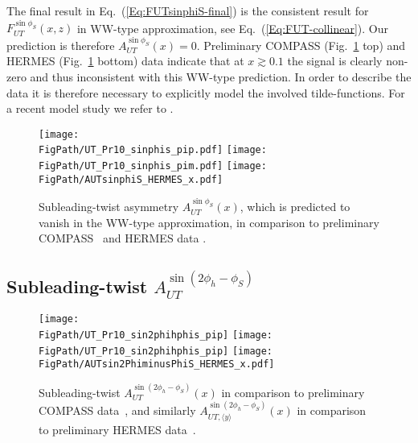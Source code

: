 \documentclass[a4paper,11pt]{article}
\newcommand{\blue}[1]{{\color{blue} #1}}
\newcommand{\ps}[1]{\blue{#1}}
\newcommand*{\FigPath}{./figs}%
\begin{document}
The final result in Eq.~(\ref{Eq:FUTsinphiS-final}) is the consistent
result for $F_{UT}^{\sin\phi_S}(x,z)$ in WW-type
approximation, see Eq.~(\ref{Eq:FUT-collinear}). Our prediction is
therefore $A_{UT}^{\sin\phi_S}(x)=0$. Preliminary
COMPASS \cite{Parsamyan:2013fia} (Fig.~\ref{autsinphis} top) and
HERMES \cite{Schnell:2010zza} (Fig.~\ref{autsinphis} bottom) data
indicate that at $x\gtrsim 0.1$ the signal is clearly non-zero and
thus inconsistent with this WW-type prediction. \ps{In order to
describe the data it is therefore necessary to explicitly model
the involved tilde-functions. For a recent model study we refer
to \cite{Mao:2014aoa}.}

\begin{figure}[h]
\centering
\texttt{[image: \\FigPath/UT\_Pr10\_sinphis\_pip.pdf]}
\texttt{[image: \\FigPath/UT\_Pr10\_sinphis\_pim.pdf]}
\texttt{[image: \\FigPath/AUTsinphiS\_HERMES\_x.pdf]}
\caption{\label{autsinphis}
 	Subleading-twist asymmetry $A_{UT}^{\sin\phi_S}(x)$, which
	is predicted to vanish in the WW-type approximation, in
	comparison to preliminary COMPASS~\cite{Parsamyan:2013fia}
	and HERMES data \cite{Schnell:2010zza}.}
\end{figure}



\newpage
\subsection{\boldmath Subleading-twist  $A_{UT}^{\sin(2\phi_h-\phi_S)}$ }
\label{Sec-7.8:FUTsin2phi-phiS}

\begin{figure}[b]
\centering
\texttt{[image: \\FigPath/UT\_Pr10\_sin2phihphis\_pip]}%
\texttt{[image: \\FigPath/UT\_Pr10\_sin2phihphis\_pip]}%
\texttt{[image: \\FigPath/AUTsin2PhiminusPhiS\_HERMES\_x.pdf]}
\caption{\label{autsin2phihphis}
	Subleading-twist $A_{UT}^{\sin(2 \phi_h - \phi_S)}(x)$  in comparison
	to preliminary COMPASS data~\cite{Parsamyan:2013fia}, and 	
	similarly $A_{UT, \langle y \rangle}^{\sin(2\phi_h-\phi_S)}(x)$ in comparison to
	preliminary HERMES data~\cite{Schnell:2010zza}.
	}
\end{figure}
\end{document}
